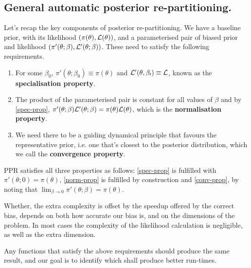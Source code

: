 \documentclass[usenatbib]{mnras}
\begin{document}
\subsection{General automatic posterior re-partitioning.}
\label{sec:orga3962ef}

Let's recap the key components of posterior re-partitioning. We have
   a baseline prior, with its likelihood \((\pi(\theta), \cal L
      (\theta))\), and a parameterised pair of biased prior and
   likelihood \((\pi'(\theta; \beta), \cal L' (\theta;
      \beta))\). These need to satisfy the following requirements.

\begin{enumerate}
\item For some \(\beta_{0}\), \(\pi'(\theta; \beta_{0}) \equiv
      \pi(\theta)\) and \({\cal L'(\theta, \beta_{0}) \equiv {\cal L}}\),
known as the \textbf{\textbf{specialisation property}}.\label{spec-prop}
\item The product of the parameterised pair is constant for all values
of \(\beta\) and by \ref{spec-prop}, \(\pi'(\theta; \beta) \cal L'
      (\theta; \beta) = \pi(\theta) \cal L (\theta)\), which is the
\textbf{\textbf{normalisation property}}.\label{norm-prop}
\item We need there to be a guiding dynamical principle that favours
the representative prior, i.e. one that's closest to the
posterior distribution, which we call the \textbf{\textbf{convergence
property}}.\label{conv-prop}
\end{enumerate}

PPR satisfies all three properties as follows: \ref{spec-prop} is
fulfilled with  \(\pi'(\theta; 0) =
   \pi(\theta)\), \ref{norm-prop} is fulfilled by construction and
\ref{conv-prop},  by noting that \(\lim_{\beta
   \rightarrow 0} \pi'(\theta; \beta) = \pi(\theta)\).

Whether, the extra complexity is offset by the speedup offered by
the correct bias, depends on both how accurate our bias is, and on
the dimensions of the problem. In most cases the complexity of the
likelihood calculation is negligible, as well as the extra
dimension.

Any functions that satisfy the above requirements should produce
the same result, and our goal is to identify which shall produce
better run-times.
\end{document}

